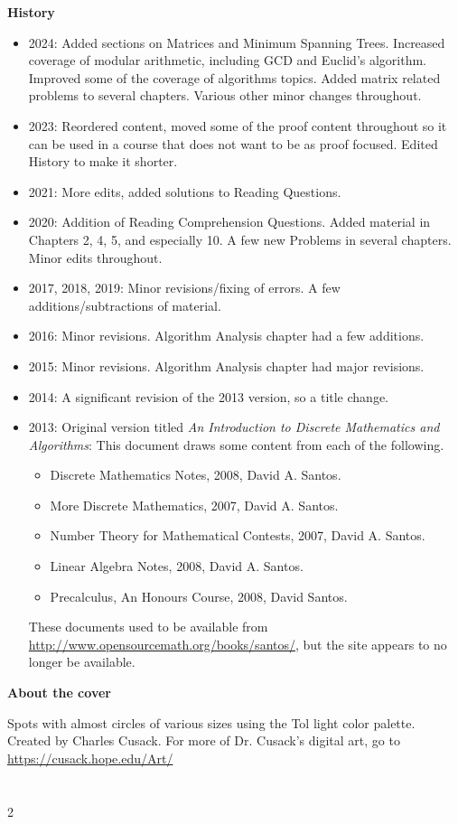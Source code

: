 \documentclass[11pt]{book}
\makeatletter
\theoremstyle{definition}
\numberwithin{requ}{chapter}
\numberwithin{thm}{chapter}
\numberwithin{pro}{chapter}
\newcommand{\twocoltoc}{%
  \section*{\contentsname
      \@mkboth{%
        }{}}%
  \begin{multicols}{2}\columnseprule 1pt \columnsep 25pt\multicoltolerance=900\small
    \@starttoc{toc}%
  \end{multicols}}
\makeatother
\begin{document}
\begin{frontmatter}
{\bf History}
\begin{itemize}
\item 2024:
Added sections on Matrices and Minimum Spanning Trees.
Increased coverage of modular arithmetic, including GCD and
Euclid's algorithm. 
Improved some of the coverage of algorithms topics.
Added matrix related problems to several chapters.
Various other minor changes throughout.
\item 2023: 
Reordered content, moved some of the proof content throughout so it can be used in a course
that does not want to be as proof focused.  Edited History to make it shorter.
\item 2021: 
More edits, added solutions to Reading Questions.
\item 2020:
Addition of Reading Comprehension Questions. 
Added material in Chapters 2, 4, 5, and especially 10. 
A few new Problems in several chapters. Minor edits throughout.
\item 2017, 2018, 2019:
Minor revisions/fixing of errors. A few additions/subtractions of material.
\item 2016:
Minor revisions.  Algorithm Analysis chapter had a few additions.
\item 2015:
Minor revisions.  Algorithm Analysis chapter had major revisions.
\item 2014:
A significant revision of the 2013 version, so a title change.
\item 2013: Original version titled {\em An Introduction to Discrete Mathematics and Algorithms}:
This document draws some content from each of the following. 
\begin{itemize}
\item Discrete Mathematics Notes, 2008, David A. Santos.
\item More Discrete Mathematics, 2007, David A. Santos.
\item Number Theory for Mathematical Contests, 2007, David A. Santos.
\item Linear Algebra Notes, 2008, David A. Santos.
\item Precalculus, An Honours Course, 2008, David Santos.
\end{itemize}
These documents used to be available from  
\href{http://www.opensourcemath.org/books/santos/}{http://www.opensourcemath.org/books/santos/},
but the site appears to no longer be available.
\end{itemize}

\vspace*{.25in}
\noindent
{\bf About the cover}

\noindent
Spots with almost circles of various sizes
using the Tol light color palette.
Created by Charles Cusack. 
For more of Dr. Cusack's digital art, go to 
\href{https://cusack.hope.edu/Art/}{https://cusack.hope.edu/Art/}

\newpage
{\normalsize
\twocoltoc{}
}


\end{frontmatter}
\end{document}
